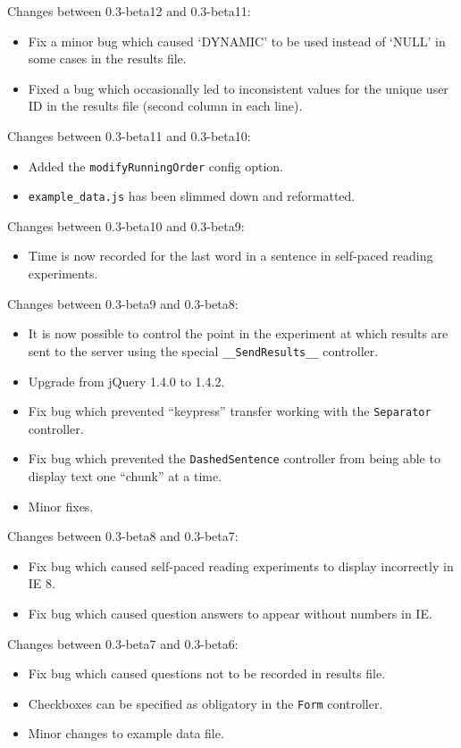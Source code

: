 \documentclass[11pt,letterpaper]{article}
\begin{document}
Changes between 0.3-beta12 and 0.3-beta11:
\begin{itemize}

\item
 Fix a minor bug which caused `DYNAMIC' to be used instead of `NULL' in some cases in the results file.
\item
 Fixed a bug which occasionally led to inconsistent values for the unique user ID in the results file (second column in each line).
\end{itemize}
Changes between 0.3-beta11 and 0.3-beta10:
\begin{itemize}

\item
 Added the \texttt{modifyRunningOrder} config option.
\item
 \texttt{example\_data.js} has been slimmed down and reformatted.
\end{itemize}
Changes between 0.3-beta10 and 0.3-beta9:
\begin{itemize}

\item
 Time is now recorded for the last word in a sentence in self-paced reading experiments.
\end{itemize}
Changes between 0.3-beta9 and 0.3-beta8:
\begin{itemize}

\item
 It is now possible to control the point in the experiment at which results are sent to the server using the special \texttt{\_\_SendResults\_\_} controller.
\item
 Upgrade from jQuery 1.4.0 to 1.4.2.
\item
 Fix bug which prevented ``keypress'' transfer working with the \texttt{Separator} controller.
\item
 Fix bug which prevented the \texttt{DashedSentence} controller from being able to display text one ``chunk'' at a time.
\item
 Minor fixes.
\end{itemize}
Changes between 0.3-beta8 and 0.3-beta7:
\begin{itemize}

\item
 Fix bug which caused self-paced reading experiments to display incorrectly in IE 8.
\item
 Fix bug which caused question answers to appear without numbers in IE.
\end{itemize}
Changes between 0.3-beta7 and 0.3-beta6:
\begin{itemize}

\item
 Fix bug which caused questions not to be recorded in results file.
\item
 Checkboxes can be specified as obligatory in the \texttt{Form} controller.
\item
 Minor changes to example data file.
\end{itemize}
\end{document}
